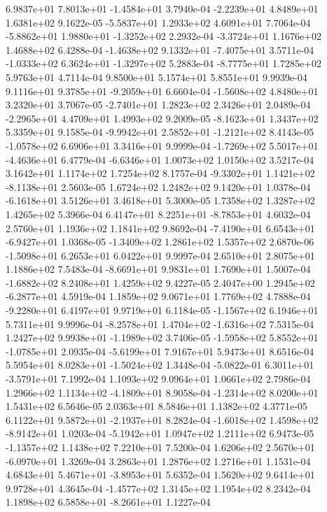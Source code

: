  6.9837e+01  7.8013e+01 -1.4584e+01  3.7940e-04
-2.2239e+01  4.8489e+01  1.6381e+02  9.1622e-05
-5.5837e+01  1.2933e+02  4.6091e+01  7.7064e-04
-5.8862e+01  1.9880e+01 -1.3252e+02  2.2932e-04
-3.3724e+01  1.1676e+02  1.4688e+02  6.4288e-04
-1.4638e+02  9.1332e+01 -7.4075e+01  3.5711e-04
-1.0333e+02  6.3624e+01 -1.3297e+02  5.2883e-04
-8.7775e+01  1.7285e+02  5.9763e+01  4.7114e-04
9.8500e+01 5.1574e+01 5.8551e+01  9.9939e-04
 9.1116e+01  9.3785e+01 -9.2059e+01  6.6604e-04
-1.5608e+02  4.8480e+01  3.2320e+01  3.7067e-05
-2.7401e+01  1.2823e+02  2.3426e+01  2.0489e-04
-2.2965e+01  4.4709e+01  1.4993e+02  9.2009e-05
-8.1623e+01  1.3437e+02  5.3359e+01  9.1585e-04
-9.9942e+01  2.5852e+01 -1.2121e+02  8.4143e-05
-1.0578e+02  6.6906e+01  3.3416e+01  9.9999e-04
-1.7269e+02  5.5017e+01 -4.4636e+01  6.4779e-04
-6.6346e+01  1.0073e+02  1.0150e+02  3.5217e-04
3.1642e+01 1.1174e+02 1.7254e+02  8.1757e-04
-9.3302e+01  1.1421e+02 -8.1138e+01  2.5603e-05
1.6724e+02 1.2482e+02 9.1420e+01  1.0378e-04
-6.1618e+01  3.5126e+01  3.4618e+01  5.3000e-05
1.7358e+02 1.3287e+02 1.4265e+02  5.3966e-04
 6.4147e+01  8.2251e+01 -8.7853e+01  4.6032e-04
2.5760e+01 1.1936e+02 1.1841e+02  9.8692e-04
-7.4190e+01  6.6543e+01 -6.9427e+01  1.0368e-05
-1.3409e+02  1.2861e+02  1.5357e+02  2.6870e-06
-1.5098e+01  6.2653e+01  6.0422e+01  9.9997e-04
2.6510e+01 2.8075e+01 1.1886e+02  7.5483e-04
-8.6691e+01  9.9831e+01  1.7690e+01  1.5007e-04
-1.6882e+02  8.2408e+01  1.4259e+02  9.4227e-05
 2.4047e+00  1.2945e+02 -6.2877e+01  4.5919e-04
1.1859e+02 9.0671e+01 1.7769e+02  4.7888e-04
-9.2280e+01  6.4197e+01  9.9719e+01  6.1184e-05
-1.1567e+02  6.1946e+01  5.7311e+01  9.9996e-04
-8.2578e+01  1.4704e+02 -1.6316e+02  7.5315e-04
 1.2427e+02  9.9938e+01 -1.1989e+02  3.7406e-05
-1.5958e+02  5.8552e+01 -1.0785e+01  2.0935e-04
-5.6199e+01  7.9167e+01  5.9473e+01  8.6516e-04
 5.5954e+01  8.0283e+01 -1.5024e+02  1.3448e-04
-5.0822e-01  6.3011e+01 -3.5791e+01  7.1992e-04
1.1093e+02 9.0964e+01 1.0661e+02  2.7986e-04
 1.2966e+02  1.1134e+02 -4.1809e+01  8.9058e-04
-1.2314e+02  8.0200e+01  1.5431e+02  6.5646e-05
2.0363e+01 8.5846e+01 1.1382e+02  4.3771e-05
 6.1122e+01  9.5872e+01 -2.1937e+01  8.2824e-04
-1.6018e+02  1.4598e+02 -8.9142e+01  1.0203e-04
-5.1942e+01  1.0947e+02  1.2111e+02  6.9473e-05
-1.1357e+02  1.1438e+02  7.2210e+01  7.5200e-04
 1.6206e+02  2.5670e+01 -6.0970e+01  1.3269e-04
3.2863e+01 1.2876e+02 1.2716e+01  1.1531e-04
 4.6843e+01  5.4671e+01 -3.8953e+01  5.6352e-04
1.5620e+02 9.6414e+01 9.9728e+01  4.3645e-04
-1.4577e+02  1.3145e+02  1.1954e+02  8.2342e-04
 1.1898e+02  6.5858e+01 -8.2661e+01  1.1227e-04
